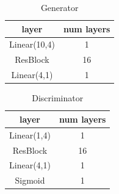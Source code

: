 \begin{table}[ht]
\caption{Generator} %
\centering %
\begin{tabular}{c c} %
\hline\hline %
layer & num layers\\%
\hline %
Linear(10,4) & 1\\ %
ResBlock & 16 \\
Linear(4,1) & 1 \\
\hline %
\end{tabular}
\label{table:1d_G} %
\end{table}

\begin{table}[ht]
\caption{Discriminator} %
\centering %
\begin{tabular}{c c} %
\hline\hline %
layer & num layers\\%
\hline %
Linear(1,4) & 1\\ %
ResBlock & 16 \\
Linear(4,1) & 1 \\
Sigmoid & 1 \\
\hline %
\end{tabular}
\label{table:1d_D} %
\end{table}
